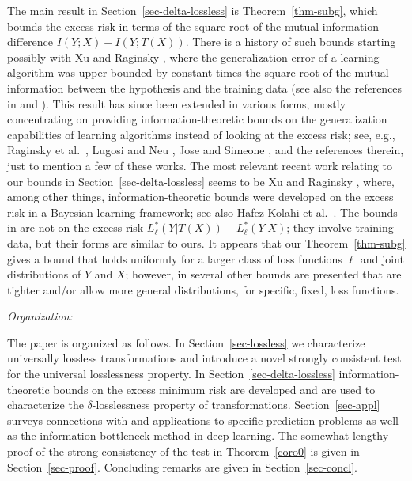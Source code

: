\documentclass[11pt]{article}
\begin{document}
The main result in Section~\ref{sec-delta-lossless} is Theorem~\ref{thm-subg}, which  bounds the excess risk in terms of the square root of the mutual information difference $I(Y;X)-I(Y;T(X))$.  There is a history of such bounds starting possibly with Xu and Raginsky \cite{XuRa17},  where the generalization error of a learning algorithm was upper bounded by constant times the square root of the mutual information between the hypothesis and the training data (see also the references in \cite{XuRa17} and \cite{XuRa22}). This result has since been extended in various forms, mostly concentrating on providing information-theoretic bounds on the generalization capabilities of learning algorithms instead of looking at the excess risk; see, e.g., Raginsky et al.\ \cite{RaRaXu21}, Lugosi and Neu \cite{LuNe22}, Jose and Simeone \cite{JoSi21}, and the references therein, just to  mention a few of these works. The most relevant recent work relating to our bounds in Section~\ref{sec-delta-lossless} seems to be Xu and Raginsky  \cite{XuRa22},  where, among other things, information-theoretic bounds were developed on the  excess risk in a Bayesian learning framework; see also Hafez-Kolahi et al.\ \cite{HaMoKa23}.  The bounds in \cite{XuRa22} are not  on the excess risk $L_\ell^*(Y|T(X)) - L_\ell^*(Y|X)$; they involve training data, but their  forms are similar to ours. It appears that our Theorem~\ref{thm-subg} gives a  bound that holds uniformly for a larger class of loss functions $\ell$  and joint distributions of $Y$ and $X$; however, in \cite{XuRa22} several other bounds are presented that are tighter and/or allow more general distributions, for specific, fixed, loss functions. 



\medskip 

\noindent\emph{Organization:}  

The paper is organized as follows. In Section~\ref{sec-lossless} we characterize universally lossless transformations and introduce a novel strongly consistent test for the universal losslessness property.
In Section~\ref{sec-delta-lossless} information-theoretic bounds on the excess minimum risk are developed and are used to characterize the $\delta$-losslessness property of transformations. Section~\ref{sec-appl} surveys connections with and applications to specific prediction problems as well as the information bottleneck method in deep learning. The somewhat lengthy  proof of the strong consistency of the test in Theorem~\ref{coro0} is given in Section~\ref{sec-proof}. 
Concluding remarks are given in Section~\ref{sec-concl}. 
\end{document}
